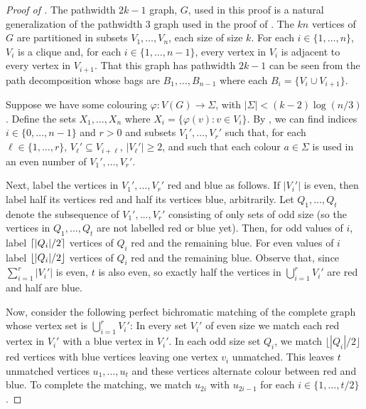 \documentclass{patmorin}
\begin{document}
\begin{proof}[Proof of ]
The pathwidth $2k-1$ graph, $G$, used in this proof is a natural
generalization of the pathwidth $3$ graph used in the proof of
.  The $kn$ vertices of $G$ are partitioned in subsets
$V_1,\ldots,V_n$, each size of size $k$.  For each $i\in\{1,\ldots,n\}$,
$V_i$ is a clique and, for each $i\in\{1,\ldots,n-1\}$, every
vertex in $V_i$ is adjacent to every vertex in $V_{i+1}$.  That this
graph has pathwidth $2k-1$ can be seen from the path decomposition whose
bags are
$B_1,\ldots,B_{n-1}$ where each $B_i=\{V_i\cup V_{i+1}\}$.

Suppose we have some colouring $\varphi:V(G)\to\Sigma$, with
$|\Sigma|<(k-2)\log(n/3)$.  Define the sets $X_1,\ldots,X_n$ where
$X_i=\{\varphi(v): v\in V_i\}$.  By , we can find indices
$i\in\{0,\ldots,n-1\}$ and $r>0$ and subsets $V_1',\ldots,V_{r}'$ such
that, for each $\ell\in\{1,\ldots,r\}$,  $V_\ell'\subseteq V_{i+\ell}$, $|V_\ell'|\ge 2$,
and such that each colour $a\in\Sigma$ is used in an even number of
$V_1',\ldots,V_r'$.

Next, label the vertices in $V_1',\ldots,V_r'$ red and blue as
follows.  If $|V_i'|$ is even, then label half its vertices red and
half its vertices blue, arbitrarily.  Let $Q_1,\ldots,Q_t$ denote the
subsequence of $V_1',\ldots,V_r'$ consisting of only sets of odd size
(so the vertices in $Q_1,\ldots,Q_t$ are not labelled red or blue yet).
Then, for odd values of $i$, label ${\lceil |Q_i|/2 \rceil}$ vertices
of $Q_i$ red and the remaining blue.  For even values of $i$ label
${\lfloor |Q_i|/2 \rfloor}$ vertices of $Q_i$ red and the remaining blue.
Observe that, since $\sum_{i=1}^r|V_i'|$ is even, $t$ is also even,
so exactly half the vertices in $\bigcup_{i=1}^r V_i'$ are red and half
are blue.

Now, consider the following perfect bichromatic matching of the complete
graph whose vertex set is
$\bigcup_{i=1}^r V_i'$: In every set $V_i'$ of even size we match each
red vertex in $V_i'$ with a blue vertex in $V_i'$.  In each odd size set
$Q_i$, we match $\lfloor|Q_i|/2\rfloor$ red vertices with blue vertices
leaving one vertex $v_i$ unmatched.  This leaves $t$ unmatched vertices
$u_1,\ldots,u_t$ and these vertices alternate colour between red and
blue. To complete the matching, we match $u_{2i}$ with $u_{2i-1}$ for
each $i\in\{1,\ldots,t/2\}$.


\end{proof}
\end{document}

